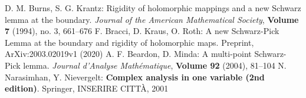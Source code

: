 \begin{thebibliography}{widest entry}
   D. M. Burns, S. G. Krantz: Rigidity of holomorphic mappings and a new Schwarz lemma at the boundary. \textit{Journal of the American Mathematical Society}, \textbf{Volume 7} (1994), no. 3, 661--676
   F. Bracci, D. Kraus, O. Roth: A new Schwarz-Pick Lemma at the boundary and rigidity of holomorphic maps. Preprint, ArXiv:2003.02019v1 (2020)
   A. F. Beardon, D. Minda: A multi-point Schwarz-Pick lemma. \textit{Journal d'Analyse Mathématique}, \textbf{Volume 92} (2004), 81--104
   N. Narasimhan, Y. Nievergelt: \textbf{Complex analysis in one variable (2nd edition)}. Springer, INSERIRE CITTÀ, 2001
\end{thebibliography}
